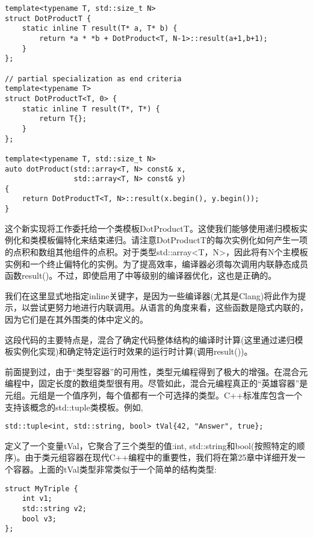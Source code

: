\begin{lstlisting}[style=styleCXX]
template<typename T, std::size_t N>
struct DotProductT {
	static inline T result(T* a, T* b) {
		return *a * *b + DotProduct<T, N-1>::result(a+1,b+1);
	}
};

// partial specialization as end criteria
template<typename T>
struct DotProductT<T, 0> {
	static inline T result(T*, T*) {
		return T{};
	}
};

template<typename T, std::size_t N>
auto dotProduct(std::array<T, N> const& x,
				std::array<T, N> const& y)
{
	return DotProductT<T, N>::result(x.begin(), y.begin());
}
\end{lstlisting}

这个新实现将工作委托给一个类模板DotProductT。这使我们能够使用递归模板实例化和类模板偏特化来结束递归。请注意DotProductT的每次实例化如何产生一项的点积和数组其他组件的点积。对于类型std::array<T，N>，因此将有N个主模板实例和一个终止偏特化的实例。为了提高效率，编译器必须每次调用内联静态成员函数result()。不过，即使启用了中等级别的编译器优化，这也是正确的。

\begin{tcolorbox}[colback=webgreen!5!white,colframe=webgreen!75!black]
\hspace*{0.75cm}我们在这里显式地指定inline关键字，是因为一些编译器(尤其是Clang)将此作为提示，以尝试更努力地进行内联调用。从语言的角度来看，这些函数是隐式内联的，因为它们是在其外围类的体中定义的。
\end{tcolorbox}

这段代码的主要特点是，混合了确定代码整体结构的编译时计算(这里通过递归模板实例化实现)和确定特定运行时效果的运行时计算(调用result())。

前面提到过，由于“类型容器”的可用性，类型元编程得到了极大的增强。在混合元编程中，固定长度的数组类型很有用。尽管如此，混合元编程真正的“英雄容器”是元组。元组是一个值序列，每个值都有一个可选择的类型。C++标准库包含一个支持该概念的std::tuple类模板。例如,

\begin{lstlisting}[style=styleCXX]
std::tuple<int, std::string, bool> tVal{42, "Answer", true};
\end{lstlisting}

定义了一个变量tVal，它聚合了三个类型的值:int, std::string和bool(按照特定的顺序)。由于类元组容器在现代C++编程中的重要性，我们将在第25章中详细开发一个容器。上面的tVal类型非常类似于一个简单的结构类型:

\begin{lstlisting}[style=styleCXX]
struct MyTriple {
	int v1;
	std::string v2;
	bool v3;
};
\end{lstlisting}

